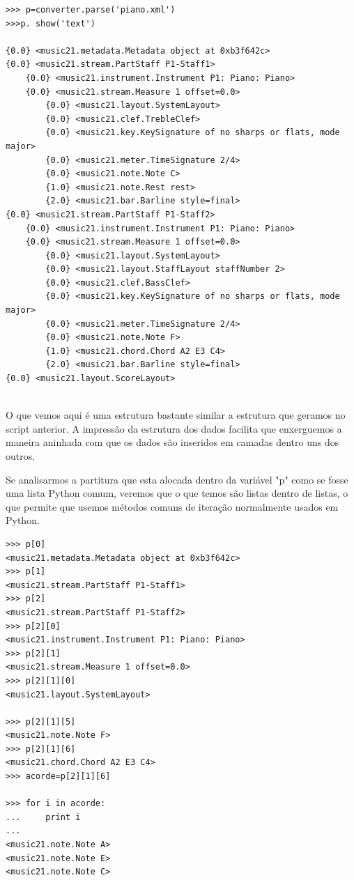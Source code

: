 \documentclass[
	12pt,				%
	openright,			%
	twoside,			%
	a4paper,			%
	english,			%
	french,				%
	spanish,			%
	brazil				%
	]{abntex2}
\begin{document}
\begin{lstlisting}
>>> p=converter.parse('piano.xml')
>>>p. show('text')

{0.0} <music21.metadata.Metadata object at 0xb3f642c>
{0.0} <music21.stream.PartStaff P1-Staff1>
    {0.0} <music21.instrument.Instrument P1: Piano: Piano>
    {0.0} <music21.stream.Measure 1 offset=0.0>
        {0.0} <music21.layout.SystemLayout>
        {0.0} <music21.clef.TrebleClef>
        {0.0} <music21.key.KeySignature of no sharps or flats, mode major>
        {0.0} <music21.meter.TimeSignature 2/4>
        {0.0} <music21.note.Note C>
        {1.0} <music21.note.Rest rest>
        {2.0} <music21.bar.Barline style=final>
{0.0} <music21.stream.PartStaff P1-Staff2>
    {0.0} <music21.instrument.Instrument P1: Piano: Piano>
    {0.0} <music21.stream.Measure 1 offset=0.0>
        {0.0} <music21.layout.SystemLayout>
        {0.0} <music21.layout.StaffLayout staffNumber 2>
        {0.0} <music21.clef.BassClef>
        {0.0} <music21.key.KeySignature of no sharps or flats, mode major>
        {0.0} <music21.meter.TimeSignature 2/4>
        {0.0} <music21.note.Note F>
        {1.0} <music21.chord.Chord A2 E3 C4>
        {2.0} <music21.bar.Barline style=final>
{0.0} <music21.layout.ScoreLayout>


\end{lstlisting}

O que vemos aqui é uma estrutura bastante similar a estrutura que geramos no script anterior. A impressão da estrutura dos dados facilita que enxerguemos a maneira aninhada com que os dados são inseridos em camadas dentro uns dos outros.

Se analisarmos a partitura que esta alocada dentro da variável "p" como se fosse uma lista Python comum, veremos que o que temos são listas dentro de listas, o que permite que usemos métodos comuns de iteração normalmente usados em Python.

\begin{lstlisting}
>>> p[0]
<music21.metadata.Metadata object at 0xb3f642c>
>>> p[1]
<music21.stream.PartStaff P1-Staff1>
>>> p[2]
<music21.stream.PartStaff P1-Staff2>
>>> p[2][0]
<music21.instrument.Instrument P1: Piano: Piano>
>>> p[2][1]
<music21.stream.Measure 1 offset=0.0>
>>> p[2][1][0]
<music21.layout.SystemLayout>

>>> p[2][1][5]
<music21.note.Note F>
>>> p[2][1][6]
<music21.chord.Chord A2 E3 C4>
>>> acorde=p[2][1][6]

>>> for i in acorde:
...     print i
... 
<music21.note.Note A>
<music21.note.Note E>
<music21.note.Note C>

\end{lstlisting}
\end{document}
